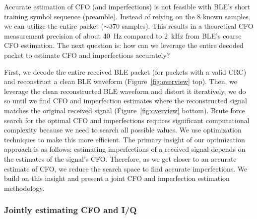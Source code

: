 Accurate estimation of CFO (and \iq imperfections) is not feasible with BLE's short 
training symbol sequence (preamble). Instead of
relying on the 8 known samples, we can utilize the entire
packet ($\sim$370 samples). This results in a theoretical CFO
measurement precision of about 40~Hz compared to 2~kHz from BLE's coarse CFO estimation. 
%
The next question is: how can we leverage the entire decoded packet to estimate 
CFO and \iq imperfections accurately?

First, we decode the entire received BLE packet (for packets with a valid CRC) and reconstruct a
clean BLE waveform (Figure~\ref{fig:overview} top).
Then, we leverage the clean reconstructed BLE waveform and distort it iteratively, 
%
we do so until we find CFO and \iq imperfection estimates where the %
reconstructed
signal matches the original received signal (Figure~\ref{fig:overview} bottom). 
Brute force search for the optimal CFO and \iq imperfections 
requires significant computational complexity because we need
to search all possible values.
We use optimization techniques to make this more efficient.
The primary insight of our optimization approach is as follows: estimating \iq imperfections of a received signal depends on the estimates of the signal's CFO.
Therefore, as we get closer to an accurate estimate of CFO, we reduce the search space to find accurate \iq imperfections. We build on this insight
 and present a joint CFO and \iq imperfection estimation methodology.


%




\subsubsection*{Jointly estimating CFO and I/Q}

